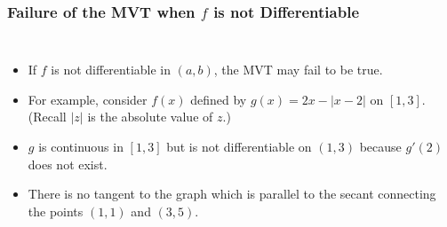 \documentclass[serif,ignorenonframetext]{beamer}
\begin{document}
\begin{frame}
  \frametitle{Failure of the MVT when $f$ is not Differentiable}
  \begin{columns}
  \begin{itemize}[<+->]
  \item If $f$ is not differentiable in $(a,b)$,
    the MVT may fail to be true.
  \item For example, consider $f(x)$ defined by
    $g(x)=2x-|x-2|$ on $[1,3]$.  (Recall $|z|$ is
    the absolute value of $z$.)
  \item $g$ is continuous in $[1,3]$ but is not
    differentiable on $(1,3)$ because $g'(2)$
    does not exist.
  \item There is no tangent to the graph which is
    parallel to the secant connecting the points
    $(1,1)$ and $(3,5)$.
  \end{itemize}
  \end{columns}
\end{frame}
\end{document}
